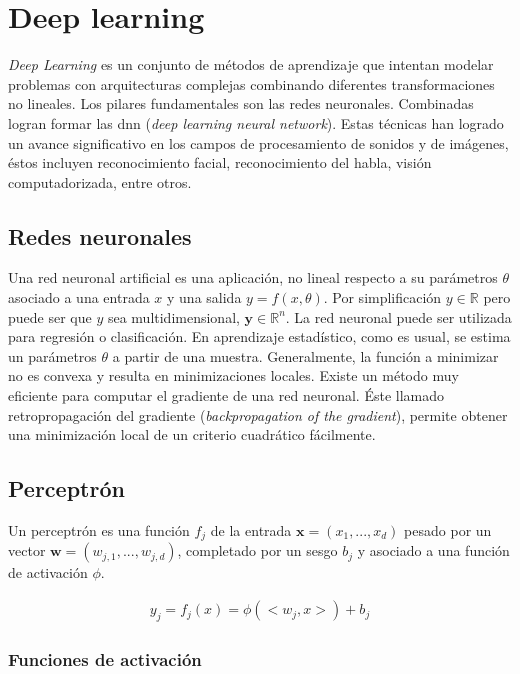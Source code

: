 \chapter{Deep learning} \label{chapter:deep-learning}

\indent \textit{Deep Learning} es un conjunto de métodos de aprendizaje que intentan modelar problemas con arquitecturas complejas combinando diferentes transformaciones no lineales. Los pilares fundamentales son las redes neuronales. Combinadas logran formar las \acrshort{dnn} (\textit{deep learning neural network}).
\indent Estas técnicas han logrado un avance significativo en los campos de procesamiento de sonidos y de imágenes, éstos incluyen reconocimiento facial, reconocimiento del habla, visión computadorizada, entre otros.

\section{Redes neuronales}

\indent Una red neuronal artificial es una aplicación, no lineal respecto a su parámetros $\theta$ asociado a una entrada $x$ y una salida $y = f(x,\theta)$. Por simplificación $y \in \mathbb{R}$ pero puede ser que $y$ sea multidimensional, $\textbf{y} \in \mathbb{R}^n$. La red neuronal puede ser utilizada para regresión o clasificación. En aprendizaje estadístico, como es usual, se estima un parámetros $\theta$ a partir de una muestra. Generalmente, la función a minimizar no es convexa y resulta en minimizaciones locales. Existe un método muy eficiente para computar el gradiente de una red neuronal. Éste llamado retropropagación del gradiente (\textit{backpropagation of the gradient}), permite obtener una minimización local de un criterio cuadrático fácilmente. 

\section{Perceptrón}

\indent Un perceptrón es una función $f_j$ de la entrada $\mathbf{x} = (x_1, ...,x_d)$ pesado por un vector $\mathbf{w} = (w_{j,1}, ..., w_{j,d})$, completado por un sesgo $b_j$ y asociado a una función de activación $\phi$.

\begin{align}
    y_j = f_j(x) = \phi(<w_j,x>) + b_j
\end{align}

\subsection*{Funciones de activación}

